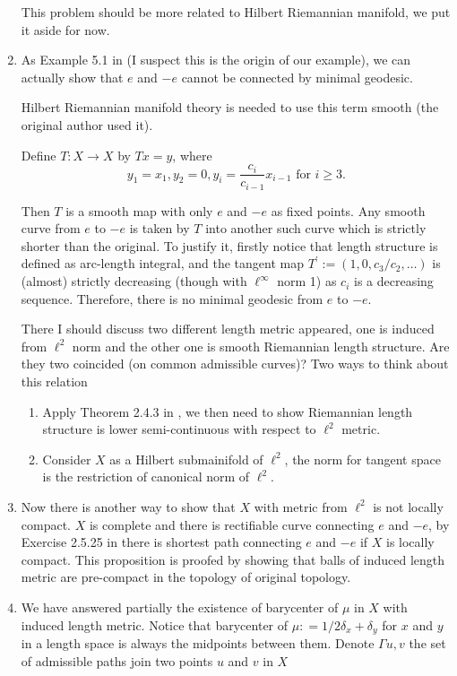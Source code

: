 \begin{rmk}
\begin{enumerate}
		      This problem should be more related to Hilbert Riemannian manifold, we put it aside for now.
		\item As Example 5.1 in \cite{grossman1965hilbert} (I suspect this is the origin of our example), we can actually show that $e$ and $-e$ cannot be connected by minimal geodesic.

		      Hilbert Riemannian manifold  theory is needed to use this term smooth (the original author used it).

		      Define \( T: X \rightarrow X \) by \( T x = y \), where
		      \[
			      y _ { 1 } = x _ { 1 } , y _ { 2 } = 0 , y _ { i } = \frac{c_i}{c_{i-1}} x_{i-1} \text { for } i \geq 3 . \]

		      Then \( T \) is a smooth map with only \( e \) and \(- e \) as fixed points. Any smooth curve from \( e\) to \( -e \) is taken by \( T \) into another such curve which is strictly shorter than the original. To justify it, firstly notice that length structure is defined as arc-length integral, and the tangent map $T^\prime := (1,0,{c_3}/{c_2}, \ldots)$ is (almost) strictly decreasing (though with $\ell^\infty$ norm 1) as $c_i$ is a decreasing sequence. Therefore, there is no minimal geodesic from \( e \) to \( -e \).

		      There I should discuss two different length metric appeared, one is induced from $\ell^2$ norm and the other one is smooth Riemannian length structure. Are they two coincided (on common admissible curves)? Two ways to think about this relation
		      \begin{enumerate}
			      \item Apply Theorem 2.4.3 in \cite{burago2001course}, we then need to show Riemannian length structure is lower semi-continuous with respect to $\ell^2$ metric.
			      \item Consider $X$ as a Hilbert submainifold of $\ell^2$, the norm for tangent space is the restriction of canonical norm of $\ell^2$.
		      \end{enumerate}

		\item Now there is another way to show that $X$ with metric from $\ell^2$ is not locally compact. $X$ is complete and there is rectifiable curve connecting $e$ and $-e$, by Exercise 2.5.25 in \cite{burago2001course} there is shortest path connecting $e$ and $-e$ if $X$ is locally compact. This proposition is proofed by showing that balls of induced length metric are pre-compact in the topology of original topology.

		\item We have answered partially the existence of barycenter of $\mu$ in $X$ with induced length metric. Notice that barycenter of $ \mu: = 1/2 {\delta_x + \delta_y } $ for $x$ and $y$ in a length space is always the midpoints between them. Denote $\Gamma{u,v}$ the set of admissible paths join two points $u$ and $v$ in $X$


	\end{enumerate}
\end{rmk}
